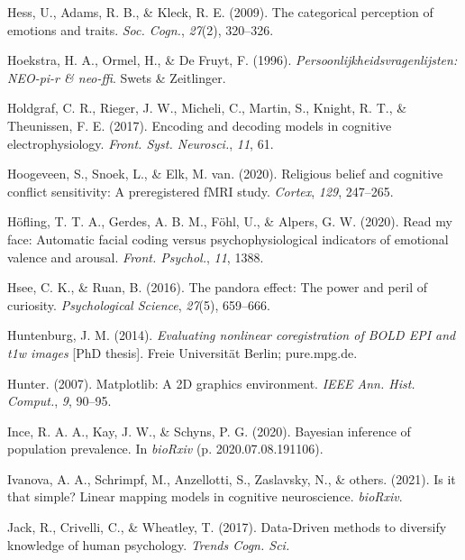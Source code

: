 \documentclass[11pt,american,]{memoir} %
\begin{document}
\leavevmode\hypertarget{ref-Hess2009-br}{}%
Hess, U., Adams, R. B., \& Kleck, R. E. (2009). The categorical perception of emotions and traits. \emph{Soc. Cogn.}, \emph{27}(2), 320--326.

\leavevmode\hypertarget{ref-Hoekstra1996-kv}{}%
Hoekstra, H. A., Ormel, H., \& De Fruyt, F. (1996). \emph{Persoonlijkheidsvragenlijsten: NEO-pi-r \& neo-ffi}. Swets \& Zeitlinger.

\leavevmode\hypertarget{ref-Holdgraf2017-eu}{}%
Holdgraf, C. R., Rieger, J. W., Micheli, C., Martin, S., Knight, R. T., \& Theunissen, F. E. (2017). Encoding and decoding models in cognitive electrophysiology. \emph{Front. Syst. Neurosci.}, \emph{11}, 61.

\leavevmode\hypertarget{ref-Hoogeveen2020-qp}{}%
Hoogeveen, S., Snoek, L., \& Elk, M. van. (2020). Religious belief and cognitive conflict sensitivity: A preregistered fMRI study. \emph{Cortex}, \emph{129}, 247--265.

\leavevmode\hypertarget{ref-Hofling2020-mk}{}%
Höfling, T. T. A., Gerdes, A. B. M., Föhl, U., \& Alpers, G. W. (2020). Read my face: Automatic facial coding versus psychophysiological indicators of emotional valence and arousal. \emph{Front. Psychol.}, \emph{11}, 1388.

\leavevmode\hypertarget{ref-hsee2016pandora}{}%
Hsee, C. K., \& Ruan, B. (2016). The pandora effect: The power and peril of curiosity. \emph{Psychological Science}, \emph{27}(5), 659--666.

\leavevmode\hypertarget{ref-Huntenburg2014-ps}{}%
Huntenburg, J. M. (2014). \emph{Evaluating nonlinear coregistration of BOLD EPI and t1w images} {[}PhD thesis{]}. Freie Universität Berlin; pure.mpg.de.

\leavevmode\hypertarget{ref-Hunter2007-at}{}%
Hunter. (2007). Matplotlib: A 2D graphics environment. \emph{IEEE Ann. Hist. Comput.}, \emph{9}, 90--95.

\leavevmode\hypertarget{ref-Ince2020-mr}{}%
Ince, R. A. A., Kay, J. W., \& Schyns, P. G. (2020). Bayesian inference of population prevalence. In \emph{bioRxiv} (p. 2020.07.08.191106).

\leavevmode\hypertarget{ref-Ivanova2021-wk}{}%
Ivanova, A. A., Schrimpf, M., Anzellotti, S., Zaslavsky, N., \& others. (2021). Is it that simple? Linear mapping models in cognitive neuroscience. \emph{bioRxiv}.

\leavevmode\hypertarget{ref-Jack2017-qp}{}%
Jack, R., Crivelli, C., \& Wheatley, T. (2017). Data-Driven methods to diversify knowledge of human psychology. \emph{Trends Cogn. Sci.}
\end{document}

